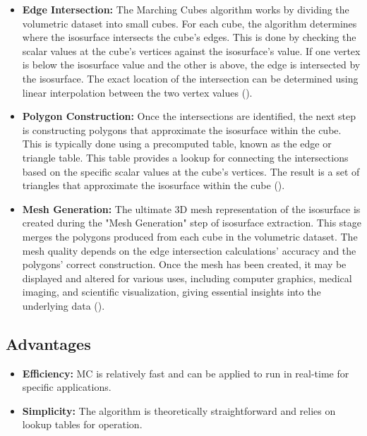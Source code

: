 \begin{itemize}
\item \textbf{Edge Intersection:}
The Marching Cubes algorithm works by dividing the volumetric dataset into small cubes. For each cube, the algorithm determines where the isosurface intersects the cube's edges. This is done by checking the scalar values at the cube's vertices against the isosurface's value. If one vertex is below the isosurface value and the other is above, the edge is intersected by the isosurface. The exact location of the intersection can be determined using linear interpolation between the two vertex values (\cite{Lorensen_1987}).
\item \textbf{Polygon Construction:}
Once the intersections are identified, the next step is constructing polygons that approximate the isosurface within the cube. This is typically done using a precomputed table, known as the edge or triangle table. This table provides a lookup for connecting the intersections based on the specific scalar values at the cube's vertices. The result is a set of triangles that approximate the isosurface within the cube (\cite{Lorensen_1987}).
\item \textbf{Mesh Generation:}
The ultimate 3D mesh representation of the isosurface is created during the "Mesh Generation" step of isosurface extraction. This stage merges the polygons produced from each cube in the volumetric dataset.  The mesh quality depends on the edge intersection calculations' accuracy and the polygons' correct construction. Once the mesh has been created, it may be displayed and altered for various uses, including computer graphics, medical imaging, and scientific visualization, giving essential insights into the underlying data (\cite{Wilhelms_1990}).
\end{itemize}

\subsection{Advantages}
\begin{itemize}
\item \textbf{Efficiency:} MC is relatively fast and can be applied to run in real-time for specific applications.
\item \textbf{Simplicity:} The algorithm is theoretically straightforward and relies on lookup tables for operation.
\end{itemize}

